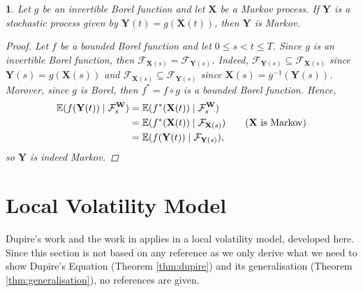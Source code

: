 \documentclass[english]{article}
\numberwithin{equation}{section}
\numberwithin{figure}{section}
\theoremstyle{bolddescit}
\newtheorem{theorem}{\protect\theoremname}[section]
\theoremstyle{definition}
\theoremstyle{definition}
\theoremstyle{plain}
\theoremstyle{plain}
\theoremstyle{bolddesc}
\theoremstyle{plain}
\theoremstyle{remark}
\providecommand{\theoremname}{Theorem}
\begin{document}
\begin{theorem}\label{thm:fp-markov-composing}
  Let $g$ be an invertible Borel function and let $\mathbf{X}$ be a Markov process. If $\mathbf{Y}$ is a stochastic process given by $\mathbf{Y}(t) = g(\mathbf{X}(t))$, then $\mathbf{Y}$ is Markov.

  \begin{proof}
    Let $f$ be a bounded Borel function and let $0 \le s < t \le T$. Since $g$ is an invertible Borel function, then $\mathcal{F}_{\mathbf{X}(s)} = \mathcal{F}_{\mathbf{Y}(s)}$. Indeed, $\mathcal{F}_{\mathbf{Y}(s)} \subseteq \mathcal{F}_{\mathbf{X}(s)}$ since $\mathbf{Y}(s) = g(\mathbf{X}(s))$ and $\mathcal{F}_{\mathbf{X}(s)} \subseteq \mathcal{F}_{\mathbf{Y}(s)}$ since $\mathbf{X}(s) = g^{-1}(\mathbf{Y}(s))$. Morover, since $g$ is Borel, then $f^* = f \circ g$ is a bounded Borel function. Hence,
    \begin{align*}
      \mathbb{E}(f(\mathbf{Y}(t)) \mid \mathcal{F}^\mathbf{W}_s)
      &= \mathbb{E}(f^*(\mathbf{X}(t)) \mid \mathcal{F}^\mathbf{W}_s)\\
      &= \mathbb{E}(f^*(\mathbf{X}(t)) \mid \mathcal{F}_{\mathbf{X}(s)}) \tag{$\mathbf{X}$ is Markov}\\
      &= \mathbb{E}(f(\mathbf{Y}(t)) \mid \mathcal{F}_{\mathbf{Y}(s)}),
    \end{align*}
    so $\mathbf{Y}$ is indeed Markov.
  \end{proof}
\end{theorem}

\section{Local Volatility Model}

Dupire's work and the work in \textcite{pablo_amster_towards_2009} applies in a local volatility model, developed here. Since this section is not based on any reference as we only derive what we need to show Dupire's Equation (Theorem \ref{thm:dupire}) and its generalisation (Theorem \ref{thm:generalisation}), no references are given.
\end{document}
